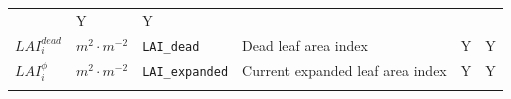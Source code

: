 \documentclass[]{book}
\begin{document}
\begin{longtable}[]{@{}llllll@{}}
\begin{minipage}[t]{0.43\columnwidth}
\end{minipage} & \begin{minipage}[t]{0.07\columnwidth}\raggedright\strut
Y\strut
\end{minipage} & \begin{minipage}[t]{0.07\columnwidth}\raggedright\strut
Y\strut
\end{minipage}\tabularnewline
\begin{minipage}[t]{0.10\columnwidth}\raggedright\strut
\(LAI^{dead}_i\)\strut
\end{minipage} & \begin{minipage}[t]{0.09\columnwidth}\raggedright\strut
\(m^2 \cdot m^{-2}\)\strut
\end{minipage} & \begin{minipage}[t]{0.06\columnwidth}\raggedright\strut
\texttt{LAI\_dead}\strut
\end{minipage} & \begin{minipage}[t]{0.43\columnwidth}\raggedright\strut
Dead leaf area index\strut
\end{minipage} & \begin{minipage}[t]{0.07\columnwidth}\raggedright\strut
Y\strut
\end{minipage} & \begin{minipage}[t]{0.07\columnwidth}\raggedright\strut
Y\strut
\end{minipage}\tabularnewline
\begin{minipage}[t]{0.10\columnwidth}\raggedright\strut
\(LAI^{\phi}_i\)\strut
\end{minipage} & \begin{minipage}[t]{0.09\columnwidth}\raggedright\strut
\(m^2 \cdot m^{-2}\)\strut
\end{minipage} & \begin{minipage}[t]{0.06\columnwidth}\raggedright\strut
\texttt{LAI\_expanded}\strut
\end{minipage} & \begin{minipage}[t]{0.43\columnwidth}\raggedright\strut
Current expanded leaf area index\strut
\end{minipage} & \begin{minipage}[t]{0.07\columnwidth}\raggedright\strut
Y\strut
\end{minipage} & \begin{minipage}[t]{0.07\columnwidth}\raggedright\strut
Y\strut
\end{minipage}\tabularnewline
\begin{minipage}[t]{0.10\columnwidth}\raggedright\strut

\end{minipage}
\end{longtable}
\end{document}
